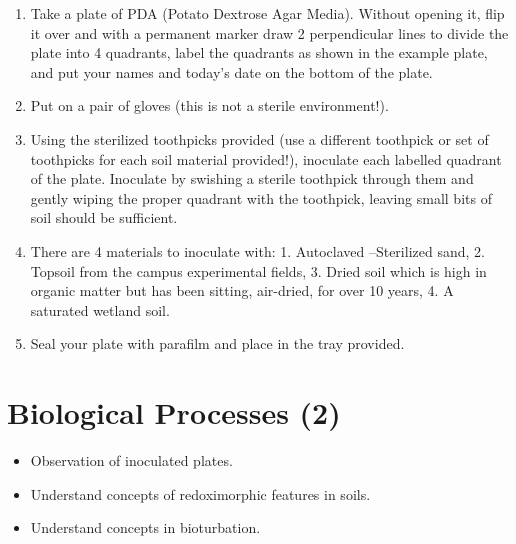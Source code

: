 \documentclass[
  letterpaper,
  twocolumn,
  portrait]{scrbook}
\providecommand{\tightlist}{%
  \setlength{\itemsep}{0pt}\setlength{\parskip}{0pt}}\usepackage{longtable,booktabs,array}
\begin{document}
\begin{enumerate}
\def\labelenumi{\arabic{enumi}.}
\tightlist
\item
  Take a plate of PDA (Potato Dextrose Agar Media). Without opening it,
  flip it over and with a permanent marker draw 2 perpendicular lines to
  divide the plate into 4 quadrants, label the quadrants as shown in the
  example plate, and put your names and today's date on the bottom of
  the plate.
\item
  Put on a pair of gloves (this is not a sterile environment!).
\item
  Using the sterilized toothpicks provided (use a different toothpick or
  set of toothpicks for each soil material provided!), inoculate each
  labelled quadrant of the plate. Inoculate by swishing a sterile
  toothpick through them and gently wiping the proper quadrant with the
  toothpick, leaving small bits of soil should be sufficient.
\item
  There are 4 materials to inoculate with: 1. Autoclaved --Sterilized
  sand, 2. Topsoil from the campus experimental fields, 3. Dried soil
  which is high in organic matter but has been sitting, air-dried, for
  over 10 years, 4. A saturated wetland soil.
\item
  Seal your plate with parafilm and place in the tray provided.
\end{enumerate}


\hypertarget{biological-processes-2}{%
\chapter{\texorpdfstring{\textbf{Biological Processes
(2)}}{Biological Processes (2)}}\label{biological-processes-2}}

\begin{tcolorbox}[enhanced jigsaw, colframe=quarto-callout-note-color-frame, coltitle=black, arc=.35mm, breakable, bottomrule=.15mm, colback=white, rightrule=.15mm, toprule=.15mm, opacityback=0, bottomtitle=1mm, left=2mm, titlerule=0mm, leftrule=.75mm, opacitybacktitle=0.6, toptitle=1mm, title=\textcolor{quarto-callout-note-color}{\faInfo}\hspace{0.5em}{Objectives}, colbacktitle=quarto-callout-note-color!10!white]

\begin{itemize}
\tightlist
\item
  Observation of inoculated plates.
\item
  Understand concepts of redoximorphic features in soils.
\item
  Understand concepts in bioturbation.
\end{itemize}

\end{tcolorbox}
\end{document}
